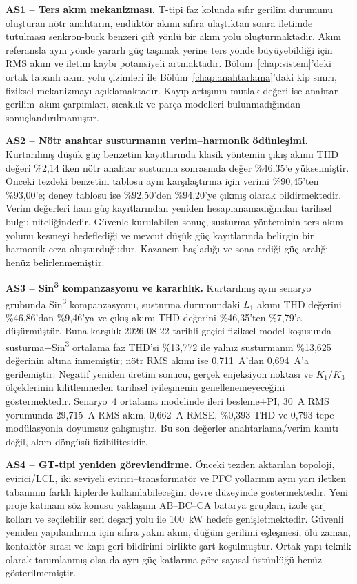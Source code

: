 \textbf{AS1 -- Ters akım mekanizması.} T-tipi faz kolunda sıfır gerilim durumunu oluşturan nötr anahtarın, endüktör akımı sıfıra ulaştıktan sonra iletimde tutulması senkron-buck benzeri çift yönlü bir akım yolu oluşturmaktadır. Akım referansla aynı yönde yararlı güç taşımak yerine ters yönde büyüyebildiği için RMS akım ve iletim kaybı potansiyeli artmaktadır. Bölüm~\ref{chap:sistem}'deki ortak tabanlı akım yolu çizimleri ile Bölüm~\ref{chap:anahtarlama}'daki kip sınırı, fiziksel mekanizmayı açıklamaktadır. Kayıp artışının mutlak değeri ise anahtar gerilim--akım çarpımları, sıcaklık ve parça modelleri bulunmadığından sonuçlandırılmamıştır.

\textbf{AS2 -- Nötr anahtar susturmanın verim--harmonik ödünleşimi.} Kurtarılmış düşük güç benzetim kayıtlarında klasik yöntemin çıkış akımı THD değeri \%2,14 iken nötr anahtar susturma sonrasında değer \%46,35'e yükselmiştir. Önceki tezdeki benzetim tablosu aynı karşılaştırma için verimi \%90,45'ten \%93,00'e; deney tablosu ise \%92,50'den \%94,20'ye çıkmış olarak bildirmektedir. Verim değerleri ham güç kayıtlarından yeniden hesaplanamadığından tarihsel bulgu niteliğindedir. Güvenle kurulabilen sonuç, susturma yönteminin ters akım yolunu kesmeyi hedeflediği ve mevcut düşük güç kayıtlarında belirgin bir harmonik ceza oluşturduğudur. Kazancın başladığı ve sona erdiği güç aralığı henüz belirlenmemiştir.

\textbf{AS3 -- Sin\textsuperscript{3} kompanzasyonu ve kararlılık.} Kurtarılmış aynı senaryo grubunda Sin\textsuperscript{3} kompanzasyonu, susturma durumundaki $L_1$ akımı THD değerini \%46,86'dan \%9,46'ya ve çıkış akımı THD değerini \%46,35'ten \%7,79'a düşürmüştür. Buna karşılık 2026-08-22 tarihli geçici fiziksel model koşusunda susturma+Sin\textsuperscript{3} ortalama faz THD'si \%13,772 ile yalnız susturmanın \%13,625 değerinin altına inmemiştir; nötr RMS akımı ise 0,711~A'dan 0,694~A'a gerilemiştir. Negatif yeniden üretim sonucu, gerçek enjeksiyon noktası ve $K_1/K_3$ ölçeklerinin kilitlenmeden tarihsel iyileşmenin genellenemeyeceğini göstermektedir. Senaryo~4 ortalama modelinde ileri besleme+PI, 30~A RMS yorumunda 29,715~A RMS akım, 0,662~A RMSE, \%0,393 THD ve 0,793 tepe modülasyonla doyumsuz çalışmıştır. Bu son değerler anahtarlama/verim kanıtı değil, akım döngüsü fizibilitesidir.

\textbf{AS4 -- GT-tipi yeniden görevlendirme.} Önceki tezden aktarılan topoloji, evirici/LCL, iki seviyeli evirici--transformatör ve PFC yollarının aynı yarı iletken tabanının farklı kiplerde kullanılabileceğini devre düzeyinde göstermektedir. Yeni proje katmanı söz konusu yaklaşımı AB--BC--CA batarya grupları, izole şarj kolları ve seçilebilir seri deşarj yolu ile \SI{100}{\kilo\watt} hedefe genişletmektedir. Güvenli yeniden yapılandırma için sıfıra yakın akım, düğüm gerilimi eşleşmesi, ölü zaman, kontaktör sırası ve kapı geri bildirimi birlikte şart koşulmuştur. Ortak yapı teknik olarak tanımlanmış olsa da ayrı güç katlarına göre sayısal üstünlüğü henüz gösterilmemiştir.

